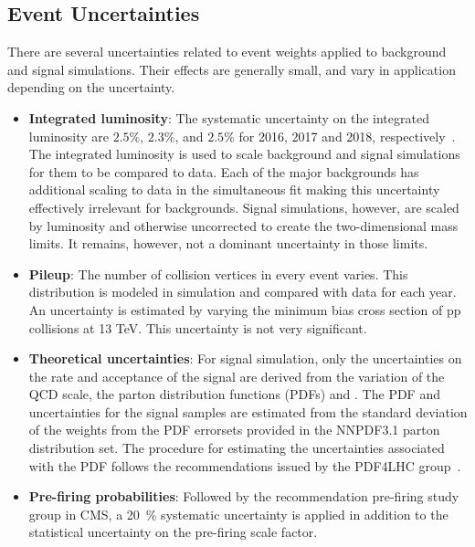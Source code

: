 \subsection{Event Uncertainties}
There are several uncertainties related to event weights applied to background and signal simulations. Their effects are generally small, and vary in application depending on the uncertainty.
\begin{itemize}

  \item {\bf Integrated luminosity}: The systematic uncertainty on the integrated luminosity are $2.5\%$, $2.3\%$, and $2.5\%$ for 2016, 2017 and 2018, respectively~\cite{CMS-PAS-LUM-17-001,CMS-PAS-LUM-17-004,CMS-PAS-LUM-18-002}. The integrated luminosity is used to scale background and signal simulations for them to be compared to data. Each of the major backgrounds has additional scaling to data in the simultaneous fit making this uncertainty effectively irrelevant for backgrounds. Signal simulations, however, are scaled by luminosity and otherwise uncorrected to create the two-dimensional \WRNR mass limits. It remains, however, not a dominant uncertainty in those limits.

  \item {\bf Pileup}: The number of collision vertices in every event varies. This distribution is modeled in simulation and compared with data for each year. An uncertainty is estimated by varying the minimum bias cross section of pp collisions at 13 TeV. This uncertainty is not very significant.

  \item {\bf Theoretical uncertainties}: For signal simulation, only the uncertainties on the rate and acceptance of the signal are derived from the variation of the QCD scale, the parton distribution functions (PDFs) and \alpS.
  The PDF and \alpS uncertainties for the \MADGRAPH signal samples are estimated from the standard deviation of the weights from the PDF errorsets provided in the NNPDF3.1 parton distribution set.
  The procedure for estimating the uncertainties associated with the PDF follows the recommendations issued by the PDF4LHC group~\cite{PDF4LHC}.
  
  \item {\bf Pre-firing probabilities}:
Followed by the recommendation pre-firing study group in CMS, a 20~\% systematic uncertainty is applied in addition to the statistical uncertainty on the pre-firing scale factor.

\end{itemize}

